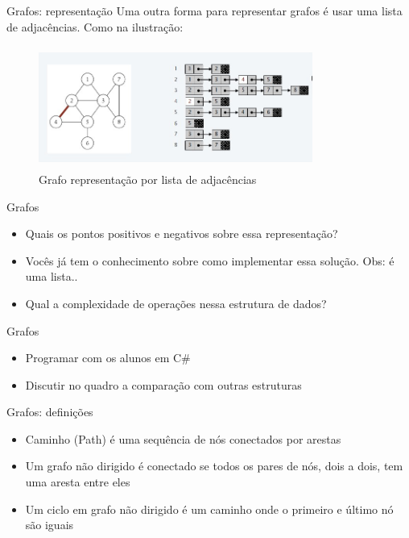 \begin{frame}
	\begin{block}{Grafos: representação}
		Uma outra forma para representar grafos é usar uma lista de adjacências.  Como na ilustração:
		\begin{figure}[!htb]
			\centering	  				
			\includegraphics[height=4cm, width = 9cm]{./pic/listaAdjacencia.jpg}
			\caption{Grafo representação por lista de adjacências}
			\label{fig_pilha}
		\end{figure}
	\end{block}
\end{frame}

\begin{frame}
	\begin{block}{Grafos}
		\begin{itemize}
			\item Quais os pontos positivos e negativos sobre essa representação?	
			\item Vocês já tem o conhecimento sobre como implementar essa solução. Obs: é uma lista..	
			\item Qual a complexidade de operações nessa estrutura de dados?
		\end{itemize}
	\end{block}
\end{frame}

\begin{frame}
	\begin{block}{Grafos}
		\begin{itemize}
			\item Programar com os alunos em C\#
			\item Discutir no quadro a comparação com outras estruturas
		\end{itemize}
	\end{block}
\end{frame}

\begin{frame}
	\begin{block}{Grafos: definições}
		\begin{itemize}
			\item Caminho (Path) é uma sequência de nós conectados por arestas	
			\item Um grafo não dirigido é conectado se todos os pares de nós, dois a dois, tem uma aresta entre eles	
			\item Um ciclo em grafo não dirigido é um caminho onde o primeiro e último nó são iguais
		\end{itemize}
	\end{block}
\end{frame}

